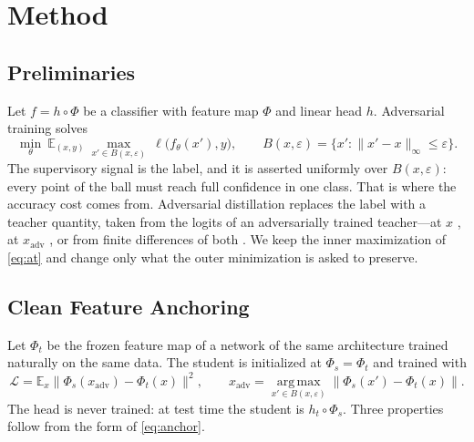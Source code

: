 
\section{Method}
\label{sec:method}

\subsection{Preliminaries}

Let $f=h\circ\Phi$ be a classifier with feature map $\Phi$ and linear head $h$. Adversarial training
\citep{madry2018towards} solves
\begin{equation}
\min_\theta\ \mathbb{E}_{(x,y)}\ \max_{x'\in B(x,\varepsilon)}\ \ell\big(f_\theta(x'),y\big),
\qquad B(x,\varepsilon)=\{x':\lVert x'-x\rVert_\infty\le\varepsilon\}.
\label{eq:at}
\end{equation}
The supervisory signal is the label, and it is asserted uniformly over $B(x,\varepsilon)$: every point
of the ball must reach full confidence in one class. That is where the accuracy cost comes from.
Adversarial distillation replaces the label with a teacher quantity, taken from the logits of an
adversarially trained teacher---at $x$ \citep{goldblum2020adversarially,zi2021revisiting}, at
$x_{\mathrm{adv}}$ \citep{huang2023boosting}, or from finite differences of both
\citep{lee2025indirect}. We keep the inner maximization of \eqref{eq:at} and change only what the
outer minimization is asked to preserve.

\subsection{Clean Feature Anchoring}
\label{sec:anchor}

Let $\Phi_t$ be the frozen feature map of a network of the same architecture trained naturally on the
same data. The student is initialized at $\Phi_s=\Phi_t$ and trained with
\begin{equation}
\mathcal{L}=\mathbb{E}_x\big\lVert\Phi_s(x_{\mathrm{adv}})-\Phi_t(x)\big\rVert^2,
\qquad
x_{\mathrm{adv}}=\operatorname*{arg\,max}_{x'\in B(x,\varepsilon)}\big\lVert\Phi_s(x')-\Phi_t(x)\big\rVert.
\label{eq:anchor}
\end{equation}
The head is never trained: at test time the student is $h_t\circ\Phi_s$. Three properties follow from
the form of \eqref{eq:anchor}.

